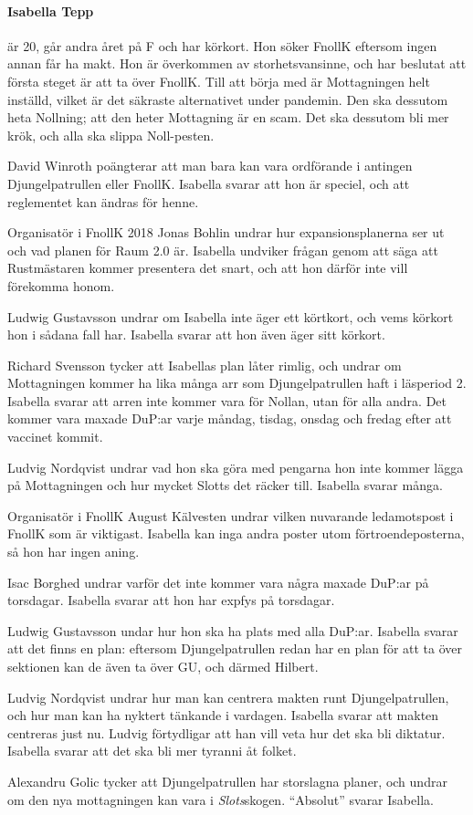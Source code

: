 \documentclass[hidelinks]{sektionsmote}
\begin{document}
\paragraph{Isabella Tepp} är 20, går andra året på F och har körkort.
Hon söker FnollK eftersom ingen annan får ha makt.
Hon är överkommen av storhetsvansinne, och har beslutat att första steget är att ta över FnollK.
Till att börja med är Mottagningen helt inställd, vilket är det säkraste alternativet under pandemin.
Den ska dessutom heta Nollning; att den heter Mottagning är en scam.
Det ska dessutom bli mer krök, och alla ska slippa Noll-pesten.\par
David Winroth poängterar att man bara kan vara ordförande i antingen Djungelpatrullen eller FnollK.
Isabella svarar att hon är speciel, och att reglementet kan ändras för henne.\par
Organisatör i FnollK 2018 Jonas Bohlin undrar hur expansionsplanerna ser ut och vad planen för Raum 2.0 är.
Isabella undviker frågan genom att säga att Rustmästaren kommer presentera det snart, och att hon därför inte vill förekomma honom.\par
Ludwig Gustavsson undrar om Isabella inte äger ett körtkort, och vems körkort hon i sådana fall har.
Isabella svarar att hon även äger sitt körkort.\par
Richard Svensson tycker att Isabellas plan låter rimlig, och undrar om Mottagningen kommer ha lika många arr som Djungelpatrullen haft i läsperiod 2.
Isabella svarar att arren inte kommer vara för Nollan, utan för alla andra.
Det kommer vara maxade DuP:ar varje måndag, tisdag, onsdag och fredag efter att vaccinet kommit.\par
Ludvig Nordqvist undrar vad hon ska göra med pengarna hon inte kommer lägga på Mottagningen och hur mycket Slotts det räcker till.
Isabella svarar många.\par
Organisatör i FnollK August Kälvesten undrar vilken nuvarande ledamotspost i FnollK som är viktigast.
Isabella kan inga andra poster utom förtroendeposterna, så hon har ingen aning.\par
Isac Borghed undrar varför det inte kommer vara några maxade DuP:ar på torsdagar.
Isabella svarar att hon har expfys på torsdagar.\par
Ludwig Gustavsson undar hur hon ska ha plats med alla DuP:ar.
Isabella svarar att det finns en plan: eftersom Djungelpatrullen redan har en plan för att ta över sektionen kan de även ta över GU, och därmed Hilbert.\par
Ludvig Nordqvist undrar hur man kan centrera makten runt Djungelpatrullen, och hur man kan ha nyktert tänkande i vardagen.
Isabella svarar att makten centreras just nu.
Ludvig förtydligar att han vill veta hur det ska bli diktatur.
Isabella svarar att det ska bli mer tyranni åt folket.\par
Alexandru Golic tycker att Djungelpatrullen har storslagna planer, och undrar om den nya mottagningen kan vara i \textit{Slots}skogen.
\enquote{Absolut} svarar Isabella.
\end{document}
